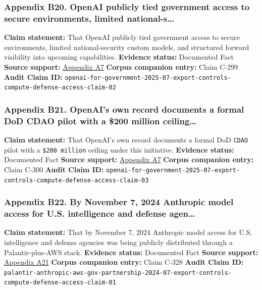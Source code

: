\documentclass[
  american,
  11pt,
  letterpaper,
]{article}
\begin{document}
\subsubsection{Appendix B20. OpenAI publicly tied government access to
secure environments, limited
national-s\ldots{}}\label{appendix-b20-openai-publicly-tied-government-access-to-secure-environments-limited-national-s}

\textbf{Claim statement:} That OpenAI publicly tied government access to
secure environments, limited national-security custom models, and
structured forward visibility into upcoming capabilities.
\textbf{Evidence status:} Documented Fact \textbf{Source support:}
\hyperref[appendix-a7-introducing-openai-for-government]{Appendix A7}
\textbf{Corpus companion entry:} Claim C-299 \textbf{Audit Claim ID:}
\texttt{openai-for-government-2025-07-export-controls-compute-defense-access-claim-02}

\subsubsection{Appendix B21. OpenAI's own record documents a formal DoD
CDAO pilot with a \$200 million
ceiling\ldots{}}\label{appendix-b21-openai-s-own-record-documents-a-formal-dod-cdao-pilot-with-a-200-million-ceiling}

\textbf{Claim statement:} That OpenAI's own record documents a formal
DoD \texttt{CDAO} pilot with a \texttt{\$200\ million} ceiling under
this initiative. \textbf{Evidence status:} Documented Fact
\textbf{Source support:}
\hyperref[appendix-a7-introducing-openai-for-government]{Appendix A7}
\textbf{Corpus companion entry:} Claim C-300 \textbf{Audit Claim ID:}
\texttt{openai-for-government-2025-07-export-controls-compute-defense-access-claim-03}

\subsubsection{Appendix B22. By November 7, 2024 Anthropic model access
for U.S. intelligence and defense
agen\ldots{}}\label{appendix-b22-by-november-7-2024-anthropic-model-access-for-u-s-intelligence-and-defense-agen}

\textbf{Claim statement:} That by November 7, 2024 Anthropic model
access for U.S. intelligence and defense agencies was being publicly
distributed through a Palantir-plus-AWS stack. \textbf{Evidence status:}
Documented Fact \textbf{Source support:}
\hyperref[appendix-a21-anthropic-and-palantir-partner-to-bring-claude-ai-models-to-aws-for-u-s-government-intelligence-and-defense-operations]{Appendix
A21} \textbf{Corpus companion entry:} Claim C-328 \textbf{Audit Claim
ID:}
\texttt{palantir-anthropic-aws-gov-partnership-2024-07-export-controls-compute-defense-access-claim-01}
\end{document}
